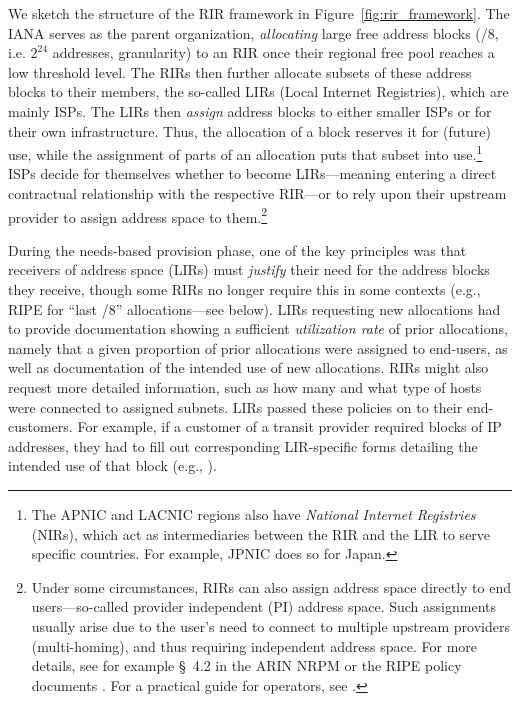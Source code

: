 \documentclass[letter]{sigcomm-alternate}
\begin{document}
We sketch the structure of the RIR framework in
Figure~\ref{fig:rir_framework}.  The IANA serves as the parent organization,
\textit{allocating} large free address blocks (/8, i.e. $2^{24}$ addresses,
granularity) to an RIR once their regional free pool reaches a low
threshold level.  The RIRs then further allocate subsets of these address
blocks to their members, the so-called LIRs (Local Internet Registries),
which are mainly ISPs. 
The LIRs then \textit{assign} address blocks to either smaller ISPs or 
for their own infrastructure. Thus, the allocation of a block  reserves it for 
(future) use, while the assignment of parts of an allocation puts that subset 
into use.\footnote{
	The APNIC and LACNIC regions also have \emph{National Internet  Registries} 
	(NIRs), which act as intermediaries between the RIR and the  LIR to serve 
	specific countries. For example, JPNIC does so for Japan.}
ISPs decide for themselves whether to become LIRs---meaning entering a direct
contractual relationship with the respective RIR---or to rely upon their
upstream provider to assign address space to them.\footnote{
	Under some circumstances, RIRs can also assign address space directly to 
	end users---so-called provider independent (PI) address space. Such
	assignments usually arise due to the user's
	need to connect to multiple upstream providers 
	(multi-homing), and thus requiring independent address space. For more 
	details, see for example \S~4.2 in the ARIN NRPM \cite{arin_manual} or the 
	RIPE policy documents \cite{ripe_policy}.  
	For a practical guide for operators, see \cite{van2002bgp}.
}

During the needs-based provision phase, one of the key principles was
that receivers of address space (LIRs) must \emph{justify} their need for
the address blocks they receive, though some RIRs no longer require this in
some contexts (e.g., RIPE for ``last /8'' allocations---see below).
LIRs requesting new allocations had to provide documentation showing a
sufficient \emph{utilization rate} of prior allocations, namely that a given
proportion of prior allocations were assigned to end-users, as well as
documentation of the intended use of new allocations. RIRs might also
request more detailed information, such as how many and what type of hosts
were connected to assigned subnets. LIRs passed these policies on to their
end-customers.  For example, if a customer of a transit provider required
blocks of IP addresses, they had to fill out corresponding LIR-specific forms
detailing the intended use of that block (e.g., \cite{ntt_policy}).
\end{document}
